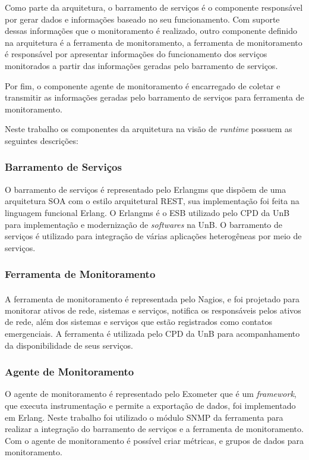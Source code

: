 Como parte da arquitetura, o barramento de serviços é o componente responsável por gerar dados e informações baseado no seu funcionamento. Com suporte dessas informações que o monitoramento é realizado, outro componente definido na arquitetura é a ferramenta de monitoramento, a ferramenta de monitoramento é responsável por apresentar informações do funcionamento dos serviços monitorados a partir das informações geradas pelo barramento de serviços. 

Por fim, o componente agente de monitoramento é encarregado de coletar e transmitir as informações geradas pelo barramento de serviços para ferramenta de monitoramento.  

Neste trabalho os componentes da arquitetura na visão de \textit{runtime}\cite{clements2002documenting} possuem as seguintes descrições:

\subsubsection{Barramento de Serviços}
O barramento de serviços é representado pelo Erlangms que dispõem de uma arquitetura SOA com o estilo arquitetural REST, sua implementação foi feita na linguagem funcional Erlang. O Erlangms é o \acrshort{ESB} utilizado pelo \acrshort{CPD} da \acrshort{UnB} para implementação e modernização de \textit{softwares} na \acrshort{UnB}. O barramento de serviços é utilizado para integração de várias aplicações heterogêneas por meio de serviços.

\subsubsection{Ferramenta de Monitoramento}
A ferramenta de monitoramento é representada pelo Nagios\textsuperscript{\textregistered}, e foi projetado para monitorar ativos de rede, sistemas e serviços, notifica os responsáveis pelos ativos de rede, além dos sistemas e serviços que estão registrados como contatos emergenciais. A ferramenta é utilizada pelo \acrshort{CPD} da \acrshort{UnB} para acompanhamento da  disponibilidade de seus serviços.

\subsubsection{Agente de Monitoramento}
O agente de monitoramento é representado pelo Exometer que é um \textit{framework}, que executa instrumentação e permite a exportação de dados, foi implementado em Erlang. Neste trabalho foi utilizado o módulo SNMP da ferramenta para realizar a integração do barramento de serviços e a ferramenta de monitoramento. Com o agente de monitoramento é possível criar métricas, e grupos de dados para monitoramento.

